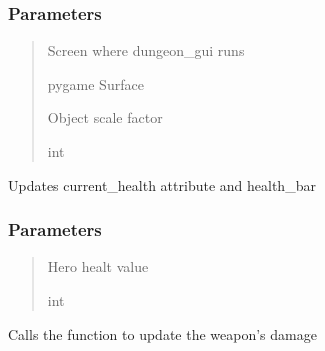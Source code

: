 \documentclass[letterpaper,10pt,english]{sphinxmanual}
\begin{document}
\begin{fulllineitems}
\begin{fulllineitems}
\subsubsection{Parameters}
\label{\detokenize{api_reference/dungeon_gui/Player:id3}}\begin{quote}\begin{description}
\sphinxAtStartPar
Screen where dungeon\_gui runs

\sphinxAtStartPar
pygame Surface

\sphinxAtStartPar
Object scale factor

\sphinxAtStartPar
int

\end{description}\end{quote}

\end{fulllineitems}


\begin{fulllineitems}
\label{\detokenize{api_reference/dungeon_gui/Player:Player.Player.update_health}}
\pysigstartsignatures
{}
\pysigstopsignatures
\sphinxAtStartPar
Updates current\_health attribute and health\_bar


\subsubsection{Parameters}
\label{\detokenize{api_reference/dungeon_gui/Player:id4}}\begin{quote}\begin{description}
\sphinxAtStartPar
Hero healt value

\sphinxAtStartPar
int

\end{description}\end{quote}

\end{fulllineitems}


\begin{fulllineitems}
\label{\detokenize{api_reference/dungeon_gui/Player:Player.Player.update_weapon}}
\pysigstartsignatures
{}
\pysigstopsignatures
\sphinxAtStartPar
Calls the function to update the weapon’s damage



\end{fulllineitems}
\end{fulllineitems}
\end{document}
